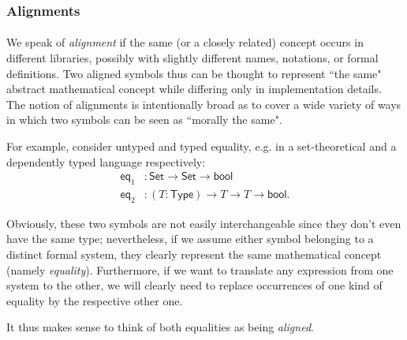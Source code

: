 \subsubsection{Alignments}

\paragraph{} We speak of \emph{alignment} if the same (or a closely related) concept occurs in different libraries, possibly with slightly different names, notations, or formal definitions. Two aligned symbols thus can be thought to represent ``the same" abstract mathematical concept while differing only in implementation details. The notion of alignments is intentionally broad as to cover a wide variety of ways in which two symbols can be seen as ``morally the same".

For example, consider untyped and typed equality, e.g. in a set-theoretical and a dependently typed language respectively:
\begin{align*}
\textsf{eq}_1 &: \textsf{Set}\to\textsf{Set}\to\textsf{bool} \\
\textsf{eq}_2 &:(T:\textsf{Type})\to T\to T\to \textsf{bool}.
\end{align*}

Obviously, these two symbols are not easily interchangeable since they don't even have the same type; nevertheless, if we assume either symbol belonging to a distinct formal system, they clearly represent the same mathematical concept (namely \emph{equality}). Furthermore, if we want to translate any expression from one system to the other, we will clearly need to replace occurrences of one kind of equality by the respective other one.

It thus makes sense to think of both equalities as being \emph{aligned}.

